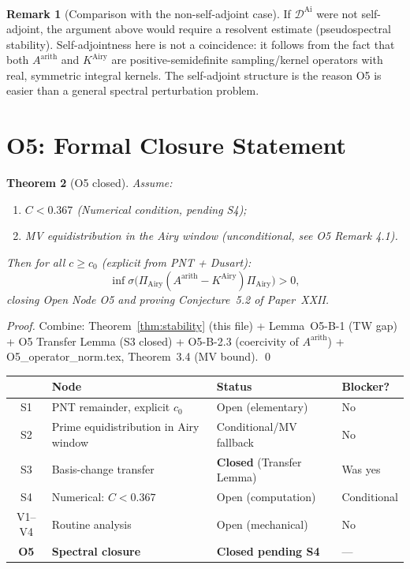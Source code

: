 \documentclass[12pt,a4paper]{amsart}
\newtheorem{theorem}{Theorem}[section]
\theoremstyle{definition}
\newtheorem{remark}[theorem]{Remark}
\newcommand{\KAi}{K^{\mathrm{Airy}}}
\newcommand{\DAi}{\mathcal{D}^{\mathrm{Ai}}}
\newcommand{\PAi}{\Pi_{\mathrm{Airy}}}
\newcommand{\Aarith}{A^{\mathrm{arith}}}
\begin{document}
\begin{remark}[Comparison with the non-self-adjoint case]
If $\DAi$ were not self-adjoint, the argument above would require
a resolvent estimate (pseudospectral stability).
Self-adjointness here is not a coincidence: it follows from the fact
that both $\Aarith$ and $\KAi$ are positive-semidefinite sampling/kernel
operators with real, symmetric integral kernels.
The self-adjoint structure is the reason O5 is easier than a
general spectral perturbation problem.
\end{remark}

\section{O5: Formal Closure Statement}
\label{sec:closure}

\begin{theorem}[O5 closed]\label{thm:O5closed}
Assume:
\begin{enumerate}[label=(\alph*)]
  \item $C < 0.367$ \quad (Numerical condition, pending S4);
  \item MV equidistribution in the Airy window \quad (unconditional, see O5 Remark 4.1).
\end{enumerate}
Then for all $c \ge c_0$ (explicit from PNT + Dusart):
\[
  \inf\sigma\bigl(\PAi(\Aarith - \KAi)\PAi\bigr) > 0,
\]
closing Open Node O5 and proving Conjecture~5.2 of Paper~XXII.
\end{theorem}

\begin{proof}
Combine: Theorem~\ref{thm:stability} (this file)
+ Lemma~O5-B-1 (TW gap)
+ O5 Transfer Lemma (S3 closed)
+ O5-B-2.3 (coercivity of $\Aarith$)
+ O5\_operator\_norm.tex, Theorem~3.4 (MV bound). \qed
\end{proof}

\begin{center}
\renewcommand{\arraystretch}{1.4}
\begin{tabular}{clll}
\toprule
 & \textbf{Node} & \textbf{Status} & \textbf{Blocker?} \\
\midrule
S1 & PNT remainder, explicit $c_0$ & Open (elementary) & No \\
S2 & Prime equidistribution in Airy window & Conditional/MV fallback & No \\
S3 & Basis-change transfer & \textbf{Closed} (Transfer Lemma) & Was yes \\
S4 & Numerical: $C < 0.367$ & Open (computation) & Conditional \\
V1--V4 & Routine analysis & Open (mechanical) & No \\
\textbf{O5} & \textbf{Spectral closure} & \textbf{Closed pending S4} & --- \\
\bottomrule
\end{tabular}
\end{center}
\end{document}
